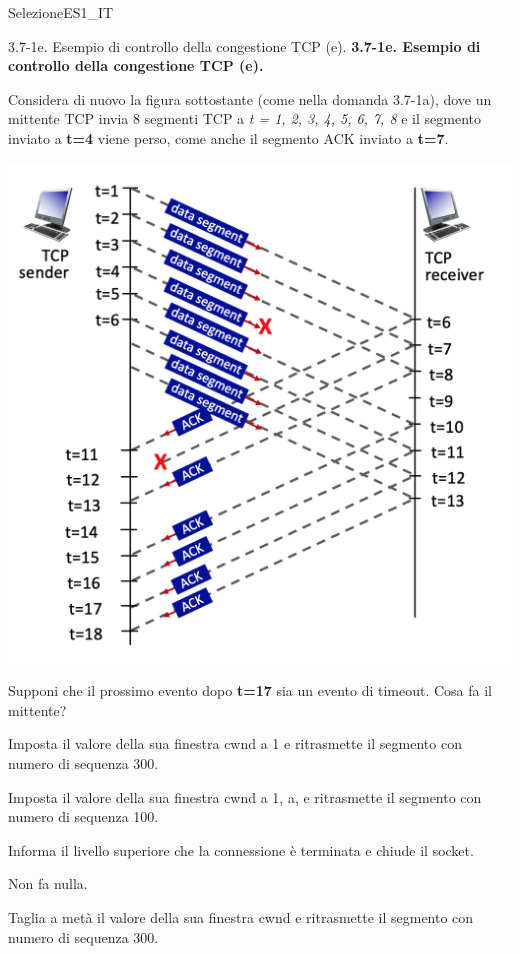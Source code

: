 \documentclass[a4paper]{article}
\begin{document}
\begin{quiz}{SelezioneES1\_IT}
\begin{multi}[points=1,shuffle]{3.7-1e. Esempio di controllo della congestione TCP (e).}
\textbf{3.7-1e. Esempio di controllo della congestione TCP (e).}

Considera di nuovo la figura sottostante (come nella domanda 3.7-1a), dove un mittente TCP invia 8 segmenti TCP a \emph{t = 1, 2, 3, 4, 5, 6, 7, 8} e il segmento inviato a \textbf{t=4} viene perso, come anche il segmento ACK inviato a \textbf{t=7}.

\begin{center}
	\includegraphics[width=\linewidth]{figs/tcp_seq_ack_1.jpg}
\end{center}

Supponi che il prossimo evento dopo \textbf{t=17} sia un evento di timeout. Cosa fa il mittente?
\item* Imposta il valore della sua finestra cwnd a 1 e ritrasmette il segmento con numero di sequenza 300.
\item Imposta il valore della sua finestra cwnd a 1, a, e ritrasmette il segmento con numero di sequenza 100.
\item Informa il livello superiore che la connessione è terminata e chiude il socket.
\item Non fa nulla.
\item Taglia a metà il valore della sua finestra cwnd e ritrasmette il segmento con numero di sequenza 300.
\end{multi}


\end{quiz}
\end{document}
